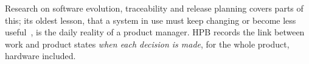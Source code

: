 Research on software evolution, traceability and release planning covers
parts of this; its oldest lesson, that a system in use must keep changing
or become less useful~\citep{lehman1980}, is the daily reality of a
product manager. HPB records the link between work and product states
\emph{when each decision is made}, for the whole product, hardware
included.
